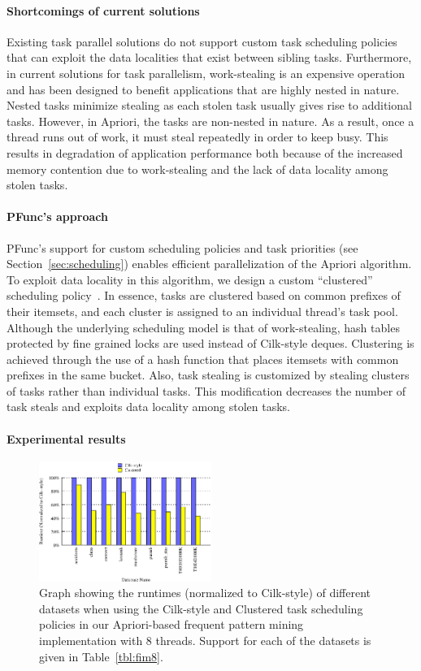 \documentclass{sig-alternate}
\begin{document}
\paragraph{Shortcomings of current solutions}
Existing task parallel solutions do not support custom task scheduling policies
that can exploit the data localities that exist between sibling tasks.
Furthermore, in current solutions for task parallelism, work-stealing is an
expensive operation and has been designed to benefit applications that are
highly nested in nature.  Nested tasks minimize stealing as each stolen task
usually gives rise to additional tasks. However, in Apriori, the tasks are
non-nested in nature. As a result, once a thread runs out of work, it must
steal repeatedly in order to keep busy.  This results in degradation of
application performance both because of the increased memory contention due to
work-stealing and the lack of data locality among stolen tasks.

\paragraph{PFunc's approach}
PFunc's support for custom scheduling policies and task priorities (see
Section~\ref{sec:scheduling}) enables efficient parallelization of the Apriori
algorithm.  To exploit data locality in this algorithm, we design a custom
``clustered'' scheduling policy~\cite{Zaki:1997}.  In essence, tasks are
clustered based on common prefixes of their itemsets, and each cluster
is assigned to an individual thread's task pool. Although the underlying
scheduling model is that of work-stealing, hash tables protected by fine
grained locks are used instead of Cilk-style deques.  Clustering is achieved
through the use of a hash function that places itemsets with common prefixes in
the same bucket.  Also, task stealing is customized by stealing clusters of
tasks rather than individual tasks. This modification decreases the number of
task steals and exploits data locality among stolen tasks.

\paragraph{Experimental results}
\begin{figure}[t]
\includegraphics[width=0.5\textwidth]{fimresults/fim_8}
\caption{Graph showing the runtimes (normalized to Cilk-style) of different
datasets when using the Cilk-style and Clustered task scheduling policies in
our Apriori-based frequent pattern mining implementation with 8 threads.
Support for each of the datasets is given in Table~\ref{tbl:fim8}.}
\label{fig:fim8}
\end{figure}
\end{document}
